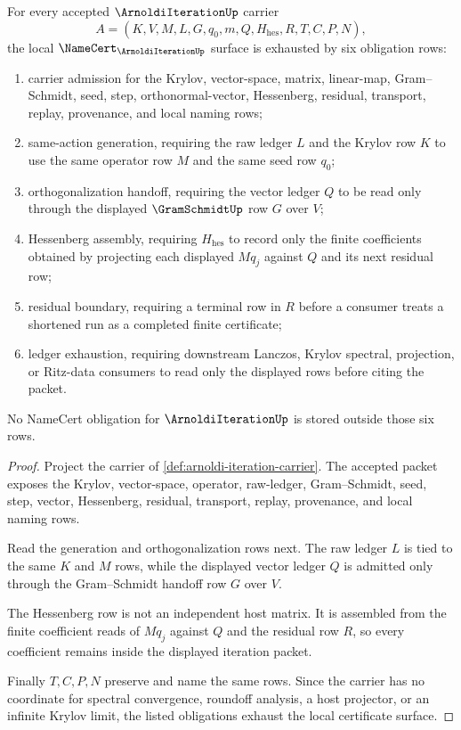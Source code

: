 \begin{theorem}
\label{thm:arnoldi-iteration-namecert-obligations}
For every accepted $\ArnoldiIterationUp$ carrier
$$
A=(K,V,M,L,G,q_0,m,Q,H_{\mathrm{hes}},R,T,C,P,N),
$$
the local $\NameCert_{\ArnoldiIterationUp}$ surface is exhausted by six obligation rows:
\begin{enumerate}
\item carrier admission for the Krylov, vector-space, matrix, linear-map, Gram--Schmidt, seed, step, orthonormal-vector, Hessenberg, residual, transport, replay, provenance, and local naming rows;
\item same-action generation, requiring the raw ledger $L$ and the Krylov row $K$ to use the same operator row $M$ and the same seed row $q_0$;
\item orthogonalization handoff, requiring the vector ledger $Q$ to be read only through the displayed $\GramSchmidtUp$ row $G$ over $V$;
\item Hessenberg assembly, requiring $H_{\mathrm{hes}}$ to record only the finite coefficients obtained by projecting each displayed $Mq_j$ against $Q$ and its next residual row;
\item residual boundary, requiring a terminal row in $R$ before a consumer treats a shortened run as a completed finite certificate;
\item ledger exhaustion, requiring downstream Lanczos, Krylov spectral, projection, or Ritz-data consumers to read only the displayed rows before citing the packet.
\end{enumerate}
No NameCert obligation for $\ArnoldiIterationUp$ is stored outside those six rows.
\end{theorem}
\begin{proof}
Project the carrier of \autoref{def:arnoldi-iteration-carrier}. The accepted packet exposes the Krylov, vector-space, operator, raw-ledger, Gram--Schmidt, seed, step, vector, Hessenberg, residual, transport, replay, provenance, and local naming rows.

Read the generation and orthogonalization rows next. The raw ledger $L$ is tied to the same $K$ and $M$ rows, while the displayed vector ledger $Q$ is admitted only through the Gram--Schmidt handoff row $G$ over $V$.

The Hessenberg row is not an independent host matrix. It is assembled from the finite coefficient reads of $Mq_j$ against $Q$ and the residual row $R$, so every coefficient remains inside the displayed iteration packet.

Finally $T,C,P,N$ preserve and name the same rows. Since the carrier has no coordinate for spectral convergence, roundoff analysis, a host projector, or an infinite Krylov limit, the listed obligations exhaust the local certificate surface.
\end{proof}

